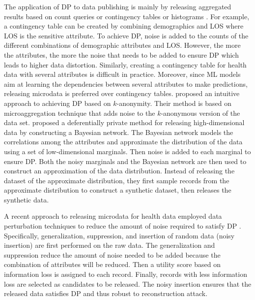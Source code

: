 \documentclass{bioinfo}
\newcommand{\mpara}[1]{\medskip\noindent{\bf #1}}
\begin{document}
\mpara{DP for data publishing of health microdata.} The application of DP to data publishing is mainly by releasing aggregated results based on count queries or contingency tables or histograms \cite{hardt2010simple, li2015differentially}. For example, a contingency table can be created by combining demographics and LOS where LOS is the sensitive attribute. To achieve DP, noise is added to the counts of the different combinations of demographic attributes and LOS. However, the more the attributes, the more the noise that needs to be added to ensure DP which leads to higher data distortion. Similarly, creating a contingency table for health data with several attributes is difficult in practice. Moreover, since ML models aim at learning the dependencies between several attributes to make predictions, releasing microdata is preferred over contingency tables.
\citet{soria2014enhancing} proposed an intuitive approach to achieving DP based on $k$-anonymity. Their method is based on microaggregation technique that adds noise to the $k$-anonymous version of the data set. \citet{zhang2017privbayes} proposed a deferentially private method for releasing high-dimensional data by constructing a Bayesian network. The Bayesian network models the correlations among the attributes and approximate the distribution of the data using a set of low-dimensional marginals. Then noise is added to each marginal to ensure DP. Both the noisy marginals and the Bayesian network are then used to construct an approximation of the data distribution. Instead of releasing the dataset of the approximate distribution, they first sample records from the approximate distribution to construct a synthetic dataset, then releases the synthetic data.

A recent approach to releasing microdata for health data employed data perturbation techniques to reduce the amount of noise required to satisfy DP \cite{lee2020differentially}. Specifically, generalization, suppression, and insertion of random data (noisy insertion) are first performed on the raw data. The generalization and suppression reduce the amount of noise needed to be added because the combination of attributes will be reduced. Then a utility score based on information loss is assigned to each record. Finally, records with less information loss are selected as candidates to be released. The noisy insertion ensures that the released data satisfies DP and thus robust to reconstruction attack.
\end{document}
